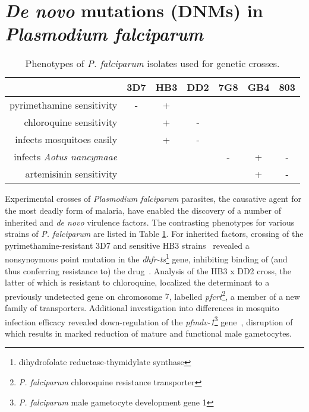 \section{\textit{De novo} mutations (DNMs) in \textit{Plasmodium falciparum}}

\begin{table}[]
\centering
\caption{Phenotypes of \textit{P. falciparum} isolates used for genetic crosses.}
\label{tb:pf_phenotypes}
\begin{tabular}{@{}rcccccc@{}}
\toprule
                                 & 3D7 & HB3 & DD2 & 7G8 & GB4 & 803 \\
\midrule
pyrimethamine sensitivity        & -   & +   &     &     &     &     \\
chloroquine sensitivity          &     & +   & -   &     &     &     \\
infects mosquitoes easily        &     & +   & -   &     &     &     \\
infects \textit{Aotus nancymaae} &     &     &     & -   & +   & -   \\
artemisinin sensitivity          &     &     &     &     & +   & -   \\
\bottomrule
\end{tabular}
\end{table}

Experimental crosses of \textit{Plasmodium falciparum} parasites, the causative agent for the most deadly form of malaria, have enabled the discovery of a number of inherited and \textit{de novo} virulence factors.  The contrasting phenotypes for various strains of \textit{P. falciparum} are listed in Table \ref{tb:pf_phenotypes}.  For inherited factors, crossing of the pyrimethamine-resistant 3D7 and sensitive HB3 strains~\cite{Walliker:1987cv} revealed a nonsynoymous point mutation in the \textit{dhfr-ts}\footnote{dihydrofolate reductase-thymidylate synthase} gene, inhibiting binding of (and thus conferring resistance to) the drug~\cite{Peterson:1988wt}.  Analysis of the HB3 x DD2 cross\cite{Wellems:1990eg}, the latter of which is resistant to chloroquine, localized the determinant to a previously undetected gene on chromosome $7$, labelled \textit{pfcrt}\footnote{\textit{P. falciparum} chloroquine resistance transporter}, a member of a new family of transporters.  Additional investigation into differences in mosquito infection efficacy revealed down-regulation of the \textit{pfmdv-1}\footnote{\textit{P. falciparum} male gametocyte development gene 1} gene~\cite{Vaidya:1995up,Furuya:2005jn}, disruption of which results in marked reduction of mature and functional male gametocytes.

